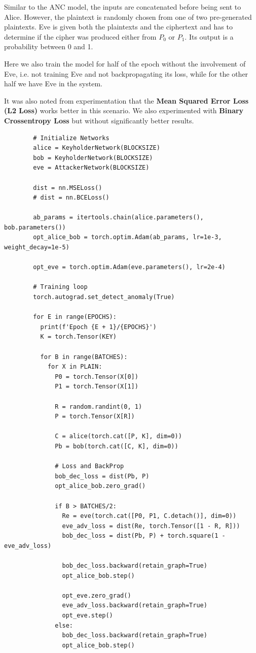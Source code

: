 \documentclass[a4paper]{article}
\begin{document}
      Similar to the ANC model, the inputs are concatenated before being sent to Alice.
      However, the plaintext is randomly chosen from one of two pre-generated plaintexts.
      Eve is given both the plaintexts and the ciphertext and has to determine if the cipher
      was produced either from $P_{0}$ or $P_{1}$. Its output is a probability between 0 and 1.

      Here we also train the model for half of the epoch without the involvement of Eve, i.e. not 
      training Eve and not backpropagating its loss, while for the other half we have Eve in the system.

      It was also noted from experimentation that the {\bfseries Mean Squared Error Loss (L2 Loss)} works better in this
      scenario. We also experimented with {\bfseries Binary Crossentropy Loss} but without significantly better results.

      \begin{lstlisting}
        # Initialize Networks
        alice = KeyholderNetwork(BLOCKSIZE)
        bob = KeyholderNetwork(BLOCKSIZE)
        eve = AttackerNetwork(BLOCKSIZE)

        dist = nn.MSELoss()
        # dist = nn.BCELoss()

        ab_params = itertools.chain(alice.parameters(), bob.parameters())
        opt_alice_bob = torch.optim.Adam(ab_params, lr=1e-3, weight_decay=1e-5)

        opt_eve = torch.optim.Adam(eve.parameters(), lr=2e-4)
        
        # Training loop
        torch.autograd.set_detect_anomaly(True)

        for E in range(EPOCHS):
          print(f'Epoch {E + 1}/{EPOCHS}')
          K = torch.Tensor(KEY)

          for B in range(BATCHES):
            for X in PLAIN:
              P0 = torch.Tensor(X[0])
              P1 = torch.Tensor(X[1])

              R = random.randint(0, 1)
              P = torch.Tensor(X[R])
                    
              C = alice(torch.cat([P, K], dim=0))
              Pb = bob(torch.cat([C, K], dim=0))

              # Loss and BackProp
              bob_dec_loss = dist(Pb, P)
              opt_alice_bob.zero_grad()

              if B > BATCHES/2:
                Re = eve(torch.cat([P0, P1, C.detach()], dim=0))
                eve_adv_loss = dist(Re, torch.Tensor([1 - R, R]))
                bob_dec_loss = dist(Pb, P) + torch.square(1 - eve_adv_loss)
              
                bob_dec_loss.backward(retain_graph=True)
                opt_alice_bob.step()

                opt_eve.zero_grad()
                eve_adv_loss.backward(retain_graph=True)
                opt_eve.step()
              else:
                bob_dec_loss.backward(retain_graph=True)
                opt_alice_bob.step()
      \end{lstlisting}
\end{document}
